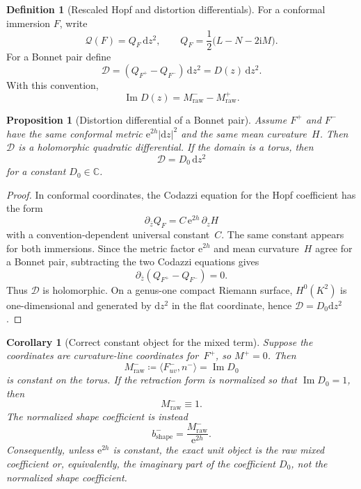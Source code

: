 \documentclass[11pt,a4paper]{article}
\theoremstyle{plain}
\newtheorem{proposition}[theorem]{Proposition}
\newtheorem{corollary}[theorem]{Corollary}
\theoremstyle{definition}
\newtheorem{definition}[theorem]{Definition}
\theoremstyle{remark}
\DeclareMathOperator{\Imag}{Im}
\newcommand{\CC}{\mathbb{C}}
\newcommand{\dd}{\mathrm{d}}
\newcommand{\ee}{\mathrm{e}}
\newcommand{\ii}{\mathrm{i}}
\newcommand{\abs}[1]{\lvert #1 \rvert}
\begin{document}
\begin{definition}[Rescaled Hopf and distortion differentials]
\label{def:distortion-differential}
For a conformal immersion $F$, write
\[
  \mathcal Q(F)=Q_F\,\dd z^2,
  \qquad
  Q_F=\frac12\bigl(L-N-2\ii M\bigr).
\]
For a Bonnet pair define
\[
  \mathcal D=(Q_{F^+}-Q_{F^-})\,\dd z^2
  =D(z)\,\dd z^2.
\]
With this convention,
\[
  \Imag D(z)=M^-_{\mathrm{raw}}-M^+_{\mathrm{raw}}.
\]
\end{definition}

\begin{proposition}[Distortion differential of a Bonnet pair]
\label{prop:C2-distortion-holomorphic}
Assume $F^+$ and $F^-$ have the same conformal metric
$\ee^{2h}\abs{\dd z}^2$ and the same mean curvature~$H$.
Then $\mathcal D$ is a holomorphic quadratic differential.  If the
domain is a torus, then
\[
  \mathcal D=D_0\,\dd z^2
\]
for a constant $D_0\in\CC$.
\end{proposition}

\begin{proof}
In conformal coordinates, the Codazzi equation for the Hopf coefficient
has the form
\[
  \partial_{\bar z}Q_F = C\,\ee^{2h}\,\partial_z H
\]
with a convention-dependent universal constant~$C$.  The same constant
appears for both immersions.  Since the metric factor $\ee^{2h}$ and
mean curvature~$H$ agree for a Bonnet pair, subtracting the two Codazzi
equations gives
\[
  \partial_{\bar z}(Q_{F^+}-Q_{F^-})=0.
\]
Thus $\mathcal D$ is holomorphic.  On a genus-one compact Riemann
surface, $H^0(K^2)$ is one-dimensional and generated by $\dd z^2$ in
the flat coordinate, hence $\mathcal D=D_0\dd z^2$.
\end{proof}

\begin{corollary}[Correct constant object for the mixed term]
\label{cor:C2-correct-object}
Suppose the coordinates are curvature-line coordinates for~$F^+$, so
$M^+=0$.  Then
\[
  M^-_{\mathrm{raw}}
  \coloneqq \langle F^-_{uv},n^-\rangle
  = \Imag D_0
\]
is constant on the torus.  If the retraction form is normalized so that
$\Imag D_0=1$, then
\[
  M^-_{\mathrm{raw}}\equiv 1.
\]
The normalized shape coefficient is instead
\[
  b^-_{\mathrm{shape}} = \frac{M^-_{\mathrm{raw}}}{\ee^{2h}}.
\]
Consequently, unless $\ee^{2h}$ is constant, the exact unit object is
the raw mixed coefficient or, equivalently, the imaginary part of the
coefficient $D_0$, not the normalized shape coefficient.
\end{corollary}
\end{document}
